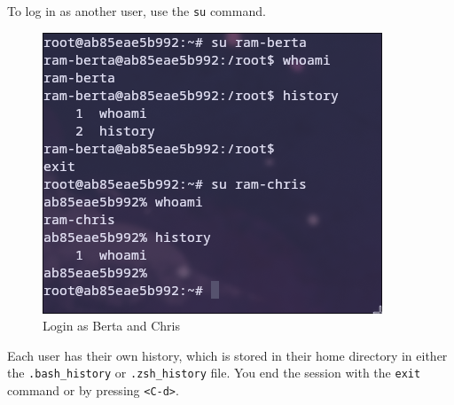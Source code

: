 \documentclass[a4paper]{article}
\begin{document}
To log in as another user, use the \texttt{su} command.

\begin{figure}[h]
	\centering
	\includegraphics[scale=0.3]{images/logggingin.png}
	\caption{Login as Berta and Chris}
\end{figure}
Each user has their own history, which is stored in their home directory in either the \texttt{.bash\_history} or \texttt{.zsh\_history} file. You end the session with the \texttt{exit} command or by pressing \texttt{<C-d>}.
\end{document}
